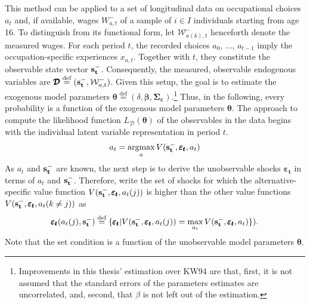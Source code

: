 \documentclass[a4paper,12pt]{article}
\DeclareMathOperator*{\argmax}{argmax}
\newcommand*{\defeq}{\stackrel{\text{def}}{=}}
\begin{document}
This method can be applied to a set of longitudinal data on occupational choices $a_t$ and, if available, wages $W_{a,t}^{-}$ of a sample of $i \in I$ individuals starting from age 16. To distinguish from its functional form, let $\mathcal{W}^{-}_{a(k),t}$ henceforth denote the measured wages. For each period $t$, the recorded choices $a_0$, ..., $a_{t-1}$  imply the occupation-specific experiences $x_{a,t}$. Together with $t$, they constitute the observable state vector $\bold{s_t^-}$. Consequently, the measured, observable endogenous variables are $\pmb{\mathcal{D}}\defeq(\bold{s_t^-},\mathcal{W}^{-}_{a,t})$. Given this setup, the goal is to estimate the exogenous model parameters $\pmb{\theta}\defeq(\delta, \pmb{\beta}, \pmb{\Sigma_\varepsilon})$.\footnote{Improvements in this thesis' estimation over KW94 are that, first, it is not assumed that the standard errors of the parameters estimates are uncorrelated, and, second, that $\beta$ is not left out of the estimation.} Thus, in the following, every probability is a function of the exogenous model parameters $\pmb{\theta}$.
The approach to compute the likelihood function $L_{\pmb{\mathcal{D}}}(\pmb{\theta})$ of the observables in the data begins with the individual latent variable representation in period $t$.
\begin{align}
a_t = \argmax_a V(\bold{s_t^-},\pmb{\varepsilon_t},a_t)
\end{align}
As $a_t$ and $\bold{s_t^-}$ are known, the next step is to derive the unobservable shocks $\pmb{\varepsilon_t}$ in terms of $a_t$ and $\bold{s_t^-}$. Therefore, write the set of shocks for which the alternative-specific value function $V(\bold{s_t^-},\pmb{\varepsilon_t},a_t(j))$ is higher than the other value functions $V(\bold{s_t^-},\pmb{\varepsilon_t},a_t(k\neq j))$ as
\begin{align}
\pmb{\varepsilon_t}(a_t(j),\bold{s_t^-}) \defeq \{\pmb{\varepsilon_t}|V(\bold{s_t^-},\pmb{\varepsilon_t},a_t(j)) = \max_{a_t} V(\bold{s_t^-},\pmb{\varepsilon_t},a_t)\}).
\end{align}
Note that the set condition is a function of the unobservable model parameters $\pmb{\theta}$.
\end{document}

